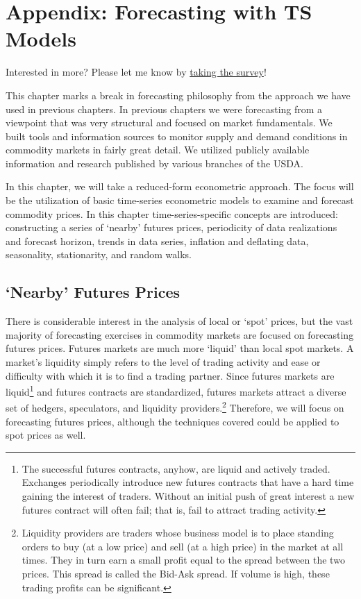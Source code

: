\documentclass[
  letterpaper,
  DIV=11,
  numbers=noendperiod]{scrreprt}
\begin{document}
\hypertarget{appendix-forecasting-with-ts-models}{%
\chapter{Appendix: Forecasting with TS
Models}\label{appendix-forecasting-with-ts-models}}

{Interested in more? Please let me know by}
\href{https://forms.gle/Q3VByCQZHjfQSy9D7}{taking the survey}!

This chapter marks a break in forecasting philosophy from the approach
we have used in previous chapters. In previous chapters we were
forecasting from a viewpoint that was very structural and focused on
market fundamentals. We built tools and information sources to monitor
supply and demand conditions in commodity markets in fairly great
detail. We utilized publicly available information and research
published by various branches of the USDA.

In this chapter, we will take a reduced-form econometric approach. The
focus will be the utilization of basic time-series econometric models to
examine and forecast commodity prices. In this chapter
time-series-specific concepts are introduced: constructing a series of
`nearby' futures prices, periodicity of data realizations and forecast
horizon, trends in data series, inflation and deflating data,
seasonality, stationarity, and random walks.

\hypertarget{nearby-futures-prices}{%
\section{`Nearby' Futures Prices}\label{nearby-futures-prices}}

There is considerable interest in the analysis of local or `spot'
prices, but the vast majority of forecasting exercises in commodity
markets are focused on forecasting futures prices. Futures markets are
much more `liquid' than local spot markets. A market's liquidity simply
refers to the level of trading activity and ease or difficulty with
which it is to find a trading partner. Since futures markets are
liquid\footnote{The successful futures contracts, anyhow, are liquid and
  actively traded. Exchanges periodically introduce new futures
  contracts that have a hard time gaining the interest of traders.
  Without an initial push of great interest a new futures contract will
  often fail; that is, fail to attract trading activity.} and futures
contracts are standardized, futures markets attract a diverse set of
hedgers, speculators, and liquidity providers.\footnote{Liquidity
  providers are traders whose business model is to place standing orders
  to buy (at a low price) and sell (at a high price) in the market at
  all times. They in turn earn a small profit equal to the spread
  between the two prices. This spread is called the Bid-Ask spread. If
  volume is high, these trading profits can be significant.} Therefore,
we will focus on forecasting futures prices, although the techniques
covered could be applied to spot prices as well.
\end{document}
